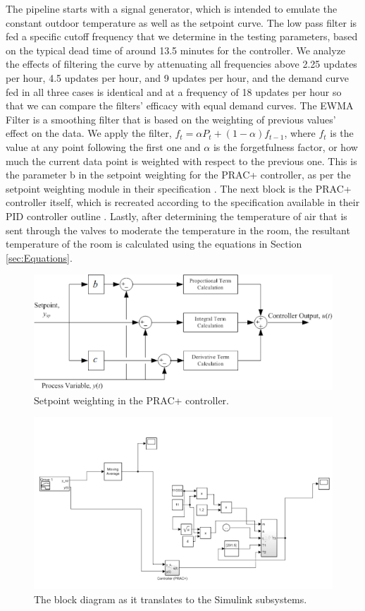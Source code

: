 \documentclass[conference,letterpaper]{IEEEtran}
\begin{document}
The pipeline starts with a signal generator, which is intended to emulate the constant outdoor temperature as well as the setpoint curve. The low pass filter is fed a specific cutoff frequency that we determine in the testing parameters, based on the typical dead time of around 13.5 minutes for the controller. We analyze the effects of filtering the curve by attenuating all frequencies above 2.25 updates per hour, 4.5 updates per hour, and 9 updates per hour, and the demand curve fed in all three cases is identical and at a frequency of 18 updates per hour so that we can compare the filters' efficacy with equal demand curves. The EWMA Filter is a smoothing filter that is based on the weighting of previous values’ effect on the data. We apply the filter, $f_t=\alpha P_t + (1-\alpha)f_{t-1}$, where $f_t$ is the value at any point following the first one and $\alpha$ is the forgetfulness factor, or how much the current data point is weighted with respect to the previous one. This is the parameter b in the setpoint weighting for the PRAC+ controller, as per the setpoint weighting module in their specification \cite{johnsoncontrolsSetpointWeighting}. The next block is the PRAC+ controller itself, which is recreated according to the specification available in their PID controller outline \cite{johnsoncontrolsPID}. Lastly, after determining the temperature of air that is sent through the valves to moderate the temperature in the room, the resultant temperature of the room is calculated using the equations in Section \ref{sec:Equations}.
\begin{figure}
    \includegraphics[scale=0.48]{prac.png}
    \caption{Setpoint weighting in the PRAC+ controller.}
\end{figure}

\begin{figure}
    \includegraphics[scale=0.48]{simulink.png}
    \caption{The block diagram as it translates to the Simulink subsystems.}
\end{figure}
\end{document}
